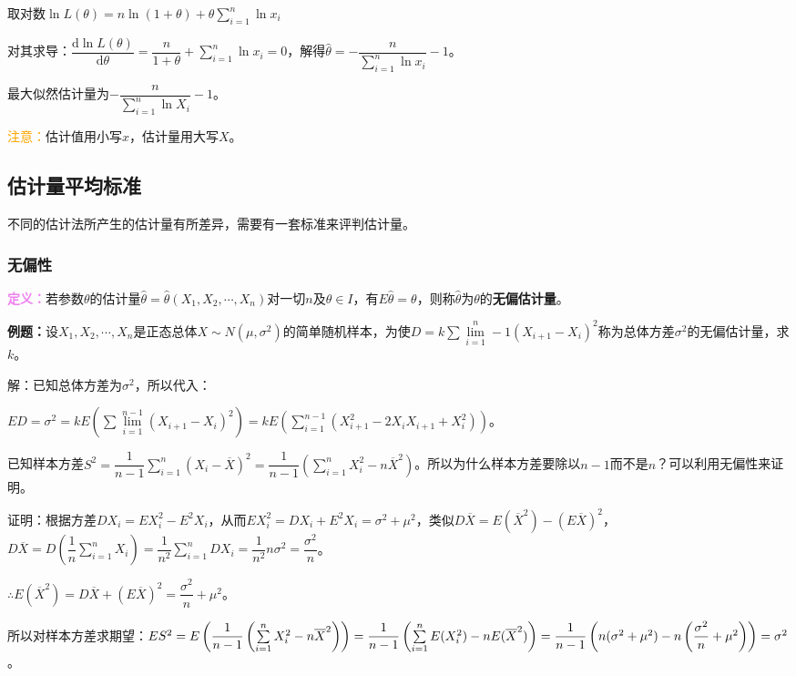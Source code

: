取对数$\ln L(\theta)=n\ln(1+\theta)+\theta\sum\limits_{i=1}^n\ln x_i$

对其求导：$\dfrac{\textrm{d}\ln L(\theta)}{\textrm{d}\theta}=\dfrac{n}{1+\theta}+\sum\limits_{i=1}^n\ln x_i=0$，解得$\hat{\theta}=-\dfrac{n}{\sum\limits_{i=1}^n\ln x_i}-1$。

最大似然估计量为$-\dfrac{n}{\sum\limits_{i=1}^n\ln X_i}-1$。

\textcolor{orange}{注意：}估计值用小写$x$，估计量用大写$X$。

\subsection{估计量平均标准}

不同的估计法所产生的估计量有所差异，需要有一套标准来评判估计量。

\subsubsection{无偏性}

\textcolor{violet}{\textbf{定义：}}若参数$\theta$的估计量$\hat{\theta}=\hat{\theta}(X_1,X_2,\cdots,X_n)$对一切$n$及$\theta\in I$，有$E\hat{\theta}=\theta$，则称$\hat{\theta}$为$\theta$的\textbf{无偏估计量}。

\textbf{例题：}设$X_1,X_2,\cdots,X_n$是正态总体$X\sim N(\mu,\sigma^2)$的简单随机样本，为使$D=k\sum\lim\limits_{i=1}^n-1(X_{i+1}-X_i)^2$称为总体方差$\sigma^2$的无偏估计量，求$k$。

解：已知总体方差为$\sigma^2$，所以代入：

$ED=\sigma^2=kE(\sum\lim\limits_{i=1}^{n-1}(X_{i+1}-X_i)^2)=kE(\sum\limits_{i=1}^{n-1}(X_{i+1}^2-2X_iX_{i+1}+X_i^2))$。

已知样本方差$S^2=\dfrac{1}{n-1}\sum\limits_{i=1}^n(X_i-\overline{X})^2=\dfrac{1}{n-1}\left(\sum\limits_{i=1}^nX_i^2-n\overline{X}^2\right)$。所以为什么样本方差要除以$n-1$而不是$n$？可以利用无偏性来证明。

证明：根据方差$DX_i=EX_i^2-E^2X_i$，从而$EX_i^2=DX_i+E^2X_i=\sigma^2+\mu^2$，类似$D\overline{X}=E(\overline{X}^2)-(E\overline{X})^2$，$D\overline{X}=D\left(\dfrac{1}{n}\sum\limits_{i=1}^nX_i\right)=\dfrac{1}{n^2}\sum\limits_{i=1}^nDX_i=\dfrac{1}{n^2}n\sigma^2=\dfrac{\sigma^2}{n}$。

$\therefore E(\overline{X}^2)=D\overline{X}+(E\overline{X})^2=\dfrac{\sigma^2}{n}+\mu^2$。

所以对样本方差求期望：$ES^2=E\left(\dfrac{1}{n-1}\left(\sum\limits_{i=1}^nX_i^2-n\overline{X}^2\right)\right)=\dfrac{1}{n-1}\\\left(\sum\limits_{i=1}^nE(X_i^2)-nE(\overline{X}^2)\right)=\dfrac{1}{n-1}\left(n(\sigma^2+\mu^2)-n\left(\dfrac{\sigma^2}{n}+\mu^2\right)\right)=\sigma^2$。

